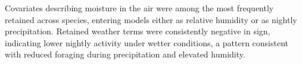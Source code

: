 \documentclass[
  letterpaper,
  DIV=11,
  numbers=noendperiod]{scrartcl}
\begin{document}
Covariates describing moisture in the air were among the most frequently
retained across species, entering models either as relative humidity or
as nightly precipitation. Retained weather terms were consistently
negative in sign, indicating lower nightly activity under wetter
conditions, a pattern consistent with reduced foraging during
precipitation and elevated humidity.

\begin{table}[H]

\caption{\label{tbl-cov-models}Covariate effects from the best-fitting
(lowest-AIC) negative binomial generalized linear mixed model for each
species' stationary and transect acoustic detector data. Estimates are
fixed-effect coefficients on the log link (± 1.96 × standard error, an
approximate 95\% confidence interval). Only species with a reportable
stationary trend model are included.}

\centering{

}
\end{table}
\end{document}
